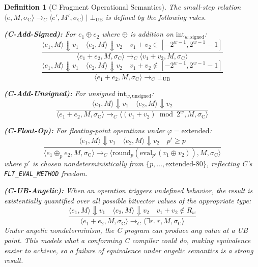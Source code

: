 \documentclass[11pt]{article}
\newtheorem{definition}[theorem]{Definition}
\newcommand{\SemConfigC}{\sigma_{\mathrm{C}}}
\newcommand{\UB}{\bot_{\mathrm{UB}}}
\begin{document}
\begin{definition}[C Fragment Operational Semantics]
\label{def:csemantics}
The small-step relation $\langle e, M, \SemConfigC \rangle \to_C \langle e', M', \SemConfigC \rangle \mid \UB$ is defined by the following rules.

\textbf{(C-Add-Signed):} For $e_1 \oplus e_2$ where $\oplus$ is addition on $\mathrm{int}_{w,\mathrm{signed}}$:
\[
\frac{\langle e_1, M \rangle \Downarrow v_1 \quad \langle e_2, M \rangle \Downarrow v_2 \quad v_1 + v_2 \in [-2^{w-1}, 2^{w-1} - 1]}
     {\langle e_1 + e_2, M, \SemConfigC \rangle \to_C \langle v_1 + v_2, M, \SemConfigC \rangle}
\]
\[
\frac{\langle e_1, M \rangle \Downarrow v_1 \quad \langle e_2, M \rangle \Downarrow v_2 \quad v_1 + v_2 \notin [-2^{w-1}, 2^{w-1} - 1]}
     {\langle e_1 + e_2, M, \SemConfigC \rangle \to_C \UB}
\]

\textbf{(C-Add-Unsigned):} For unsigned $\mathrm{int}_{w,\mathrm{unsigned}}$:
\[
\frac{\langle e_1, M \rangle \Downarrow v_1 \quad \langle e_2, M \rangle \Downarrow v_2}
     {\langle e_1 + e_2, M, \SemConfigC \rangle \to_C \langle (v_1 + v_2) \bmod 2^w, M, \SemConfigC \rangle}
\]

\textbf{(C-Float-Op):} For floating-point operations under $\varphi = \mathrm{extended}$:
\[
\frac{\langle e_1, M \rangle \Downarrow v_1 \quad \langle e_2, M \rangle \Downarrow v_2 \quad p' \geq p}
     {\langle e_1 \oplus_p e_2, M, \SemConfigC \rangle \to_C \langle \mathrm{round}_p(\mathrm{eval}_{p'}(v_1 \oplus v_2)), M, \SemConfigC \rangle}
\]
where $p'$ is chosen nondeterministically from $\{p, \ldots, \mathrm{extended\text{-}80}\}$, reflecting C's \texttt{FLT\_EVAL\_METHOD} freedom.

\textbf{(C-UB-Angelic):} When an operation triggers undefined behavior, the result is existentially quantified over all possible bitvector values of the appropriate type:
\[
\frac{\langle e_1, M \rangle \Downarrow v_1 \quad \langle e_2, M \rangle \Downarrow v_2 \quad v_1 + v_2 \notin R_w}
     {\langle e_1 + e_2, M, \SemConfigC \rangle \to_C \langle \exists r.\; r, M, \SemConfigC \rangle}
\]
Under angelic nondeterminism, the C program \emph{can produce any value} at a UB point. This models what a conforming C compiler \emph{could} do, making equivalence \emph{easier} to achieve, so a \emph{failure} of equivalence under angelic semantics is a strong result.
\end{definition}
\end{document}
